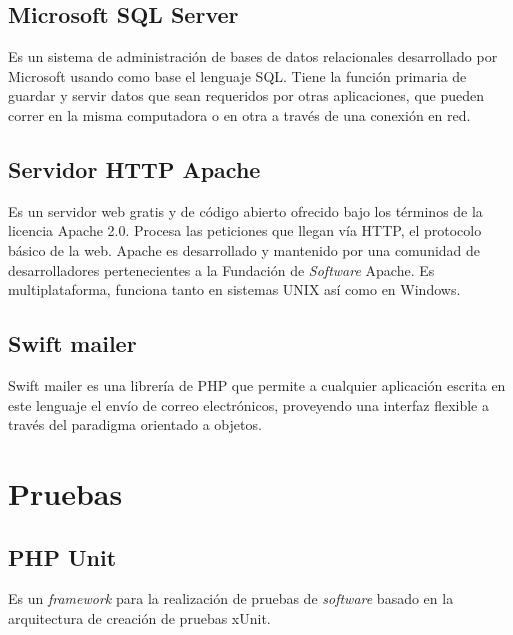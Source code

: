 \subsection{Microsoft SQL Server}

Es un sistema de administración de bases de datos relacionales desarrollado por Microsoft usando como base el lenguaje \gls{SQL}. Tiene la función primaria de guardar y servir datos que sean requeridos por otras aplicaciones, que pueden correr en la misma computadora o en otra a través de una conexión en red\cite{bib:mssql}. 

\subsection{Servidor HTTP Apache}

Es un servidor web gratis y de código abierto ofrecido bajo los términos de la licencia Apache 2.0. Procesa las peticiones que llegan vía \gls{HTTP}, el protocolo básico de la web. Apache es desarrollado y mantenido por una comunidad de desarrolladores pertenecientes a la Fundación de \emph{Software} Apache. Es multiplataforma, funciona tanto en sistemas UNIX así como en Windows\cite{bib:apache}. 

\subsection{Swift mailer}
Swift mailer es una librería de \gls{PHP} que permite a cualquier aplicación escrita en este lenguaje el envío de correo electrónicos, proveyendo una interfaz flexible a través del paradigma orientado a objetos\cite{bib:swiftmailer}. 

\section{Pruebas}

\subsection{PHP Unit}

Es un \emph{framework} para la realización de pruebas de \emph{software} basado en la arquitectura de creación de pruebas xUnit\cite{bib:phpunit}. 




